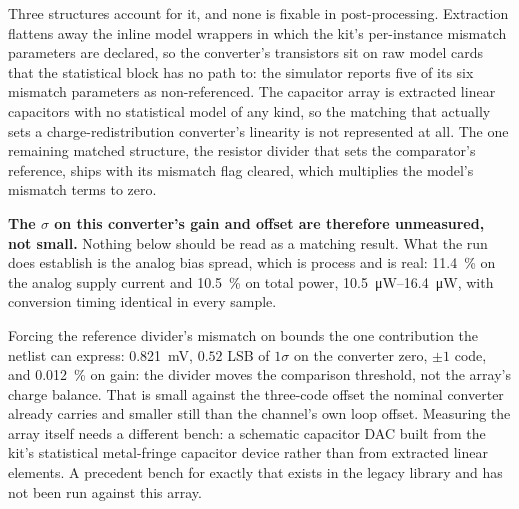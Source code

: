 Three structures account for it, and none is fixable in post-processing.
Extraction flattens away the inline model wrappers in which the kit's
per-instance mismatch parameters are declared, so the converter's transistors
sit on raw model cards that the statistical block has no path to: the
simulator reports five of its six mismatch parameters as non-referenced. The
capacitor array is extracted linear capacitors with no statistical model of any
kind, so the matching that actually sets a charge-redistribution converter's
linearity is not represented at all. The one remaining matched structure, the
resistor divider that sets the comparator's reference, ships with its mismatch
flag cleared, which multiplies the model's mismatch terms to zero.

\textbf{The \(\sigma\) on this converter's gain and offset are therefore
unmeasured, not small.} Nothing below should be read as a matching result. What
the run does establish is the analog bias spread, which is process and is real:
\SI{11.4}{\percent} on the analog supply current and \SI{10.5}{\percent} on
total power, \SIrange{10.5}{16.4}{\micro\watt}, with conversion timing identical
in every sample.

Forcing the reference divider's mismatch on bounds the one contribution the
netlist can express: \SI{0.821}{\milli\volt}, \(0.52\) LSB of \(1\sigma\) on the
converter zero, \(\pm 1\) code, and \SI{0.012}{\percent} on gain: the divider
moves the comparison threshold, not the array's charge balance. That is small
against the three-code offset the nominal converter already carries and smaller
still than the channel's own loop offset. Measuring the array itself needs a
different bench: a schematic capacitor DAC built from the kit's statistical
metal-fringe capacitor device rather than from extracted linear elements. A
precedent bench for exactly that exists in the legacy library and has not been
run against this array.
